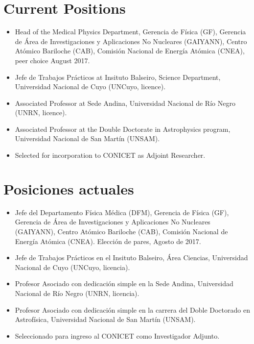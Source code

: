 \ifeng
\section*{Current Positions}
\begin{itemize}
	\item Head of the Medical Physics Department, Gerencia de Física (GF), Gerencia de Área de Investigaciones y Aplicaciones No Nucleares (GAIYANN), Centro Atómico Bariloche (CAB), Comisión Nacional de Energía Atómica (CNEA), peer choice August 2017.
  \item Jefe de Trabajos Prácticos at Insituto Balseiro, Science Department, Universidad Nacional de Cuyo (UNCuyo, licence).
  \item Associated Professor at Sede Andina, Universidad Nacional de Río Negro (UNRN, licence).
  \item Associated Professor at the Double Doctorate in Astrophysics program, Universidad Nacional de San Martín (UNSAM).
  \item Selected for incorporation to CONICET as Adjoint Researcher.
\end{itemize}
\else
\section*{Posiciones actuales}
\begin{itemize}
	\item Jefe del Departamento Física Médica (DFM), Gerencia de Física (GF), Gerencia de Área de Investigaciones y Aplicaciones No Nucleares (GAIYANN), Centro Atómico Bariloche (CAB), Comisión Nacional de Energía Atómica (CNEA). Elección de pares, Agosto de 2017.
	\item Jefe de Trabajos Prácticos en el Insituto Balseiro, Área Ciencias, Universidad Nacional de Cuyo (UNCuyo, licencia).
	\item Profesor Asociado con dedicación simple en la Sede Andina, Universidad Nacional de Río Negro (UNRN, licencia).
	\item Profesor Asociado con dedicación simple en la carrera del Doble Doctorado en Astrofísica, Universidad Nacional de San Martín (UNSAM).
	\item Seleccionado para ingreso al CONICET como Investigador Adjunto.
\end{itemize}
\fi

